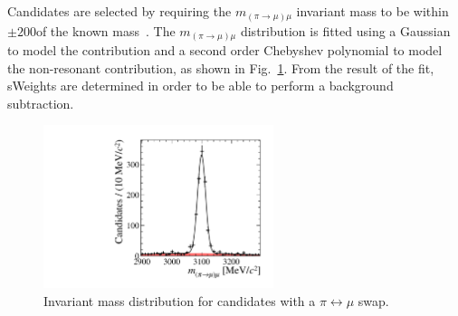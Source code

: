Candidates are selected by requiring the $m_{(\pi\to\mu)\mu}$ invariant mass to be within $\pm200$\mevcc of the known \jpsi mass~\cite{pdg}. The $m_{(\pi\to\mu)\mu}$ distribution is fitted using a Gaussian to model the \BdToJPsiKpi contribution and a second order Chebyshev polynomial to model the non-resonant contribution, as shown in Fig.~\ref{fig:appendix::kernel:massfit}. From the result of the fit, sWeights are determined in order to be able to perform a background subtraction.

\begin{figure}[!hb]
\centering
\includegraphics[width=0.6\textwidth]{figs/kpimm/selection/jpsi_pimu_fit.pdf}
\caption{Invariant mass distribution for \BdToJPsiKpi candidates with a $\pi\leftrightarrow\mu$ swap.}
\label{fig:appendix::kernel:massfit}
\end{figure}

